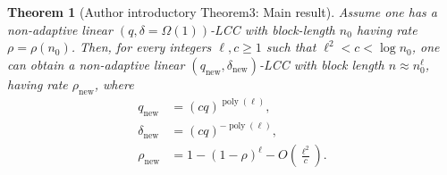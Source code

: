 \documentclass[10pt,a4paper]{article}
\newtheorem{nttheorem}{Theorem}
\begin{document}
\begin{nttheorem}[Author introductory Theorem3: Main result]
Assume one has a non-adaptive linear $(q,\delta=\Omega(1))$-LCC with block-length $n_0$ having rate $\rho=\rho(n_0)$. Then, for every integers $\ell,c\geq1$ such that $\ell^2<c<\log n_0$, one can obtain a non-adaptive linear $(q_{\mathrm{new}},\delta_{\mathrm{new}})$-LCC with block length $n\approx n_0^\ell$, having rate $\rho_{\mathrm{new}}$, where
\begin{align*}q_{\mathrm{new}}&=(cq)^{\operatorname{poly}(\ell)},\\\delta_{\mathrm{new}}&=(cq)^{-\operatorname{poly}(\ell)},\\\rho_{\mathrm{new}}&=1-(1-\rho)^\ell-O\left(\frac{\ell^2}c\right).\end{align*}
\end{nttheorem}
\end{document}
